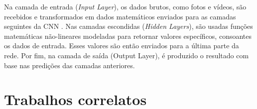 Na camada de entrada (\textit{Input Layer}), os dados brutos, como fotos e vídeos, são recebidos e transformados em dados matemáticos enviados para as camadas seguintes da CNN \cite{cnn}. Nas camadas escondidas (\textit{Hidden Layers}), são usadas funções matemáticas não-lineares modeladas para retornar valores específicos, consoantes os dados de entrada. Esses valores são então enviados para a última parte da rede. Por fim, na camada de saída (Output Layer), é produzido o resultado com base nas predições das camadas anteriores.








%
\section{\esp Trabalhos correlatos}






